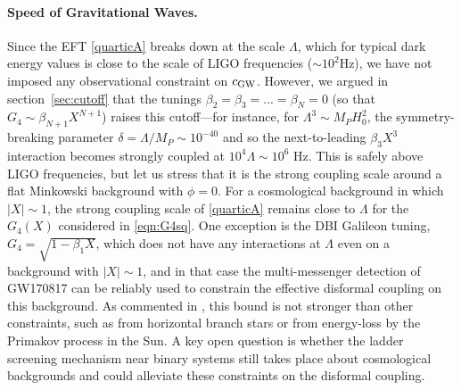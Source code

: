 \documentclass[11pt]{article}
\begin{document}
\paragraph{Speed of Gravitational Waves.}
Since the EFT \eqref{quarticA} breaks down at the scale $\Lambda$, which for typical dark energy values is close to the scale of LIGO frequencies ($\sim 10^2$Hz), we have not imposed any observational constraint on $c_{\rm GW}$.
However, we argued in section~\ref{sec:cutoff} that the tunings $\beta_2 = \beta_3 = ... = \beta_N = 0$ (so that $G_4 \sim \beta_{N+1} X^{N+1}$) raises this cutoff---for instance, for $\Lambda^3 \sim M_P H_0^2$, the symmetry-breaking parameter $\delta = \Lambda/M_P \sim 10^{-40}$ and so the next-to-leading $\beta_3 X^3$ interaction becomes strongly coupled at $10^4 \Lambda \sim 10^6$ Hz. This is safely above LIGO frequencies, but let us stress that it is the strong coupling scale around a flat Minkowski background with $\phi = 0$. For a cosmological background in which $|X| \sim 1$, the strong coupling scale of \eqref{quarticA} remains close to $\Lambda$ for the $G_4(X)$ considered in \eqref{eqn:G4sq}.
One exception is the DBI Galileon tuning, $G_4 = \sqrt{1-\beta_1 X}$, which does not have any interactions at $\Lambda$ even on a background with $|X| \sim 1$, and in that case the multi-messenger detection of GW170817 can be reliably used to constrain the effective disformal coupling on this background. As commented in \cite{Sakstein:2017xjx}, this bound is not stronger than other constraints, such as from horizontal branch stars or from energy-loss by the Primakov process in the Sun. 
A key open question is whether the ladder screening mechanism near binary systems still takes place about cosmological backgrounds and could alleviate these constraints on the disformal coupling.  


\end{document}
